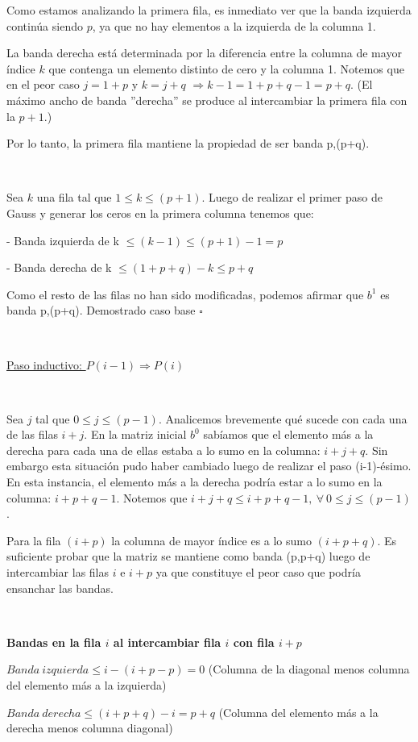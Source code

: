 Como estamos analizando la primera fila, es inmediato ver que la banda izquierda continúa siendo $p$, ya que no hay elementos
a la izquierda de la columna 1.

La banda derecha está determinada por la diferencia entre la columna de mayor índice $k$ que contenga un elemento distinto
de cero y la columna 1. Notemos que en el peor caso $j=1+p$ y $k=j+q$ $\Rightarrow k-1 = 1+p+q-1 = p+q$. (El máximo ancho de 
banda ''derecha'' se produce al intercambiar la primera fila con la $p+1$.)

Por lo tanto, la primera fila mantiene la propiedad de ser banda p,(p+q).

~

Sea $k$ una fila tal que $1 \leq k \leq (p+1)$. Luego de realizar el primer paso de Gauss y generar los ceros en la 
primera columna tenemos que:

- Banda izquierda de k $\leq (k-1) \leq (p+1)-1 = p$

- Banda derecha de k $ \leq (1+p+q)-k \leq p+q $

Como el resto de las filas no han sido modificadas, podemos afirmar que $b^{1}$ es banda p,(p+q). 
Demostrado caso base $\square$

~

\underline{Paso inductivo: $P(i-1) \Rightarrow P(i)$}

~

Sea $j$ tal que $0 \leq j \leq (p-1)$. Analicemos brevemente qué sucede con cada una de las filas $i+j$.
En la matriz inicial $b^{0}$ sabíamos que el elemento más a la derecha para cada una de ellas estaba a lo sumo en la columna:
$i+j+q$. Sin embargo esta situación pudo haber cambiado luego de realizar el paso (i-1)-ésimo. En esta instancia, el
elemento más a la derecha podría estar a lo sumo en la columna: $i+p+q-1$. Notemos que $i+j+q \leq i+p+q-1 , \ \forall 
\ 0 \leq j \leq (p-1)$.

Para la fila $(i+p)$ la columna de mayor índice es a lo sumo $(i+p+q)$. Es suficiente probar que la matriz se mantiene como 
banda (p,p+q) luego de intercambiar las filas $i$ e $i+p$ ya que constituye el peor caso que podría ensanchar las bandas.

~

\textbf{Bandas en la fila $i$ al intercambiar fila $i$ con fila $i+p$}

$Banda \ izquierda \leq i - (i+p-p) = 0$ (Columna de la diagonal menos columna del elemento más a la izquierda)

$Banda \ derecha \leq (i+p+q) - i = p+q$ (Columna del elemento más a la derecha menos columna diagonal)

